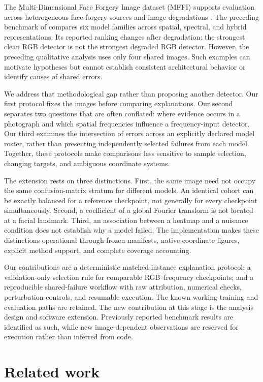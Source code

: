 \documentclass{article}
\begin{document}
The Multi-Dimensional Face Forgery Image dataset (MFFI) supports evaluation across heterogeneous face-forgery sources and image degradations \citep{miao2025}. The preceding benchmark of \citet{cunha2026} compares six model families across spatial, spectral, and hybrid representations. Its reported ranking changes after degradation: the strongest clean RGB detector is not the strongest degraded RGB detector. However, the preceding qualitative analysis uses only four shared images. Such examples can motivate hypotheses but cannot establish consistent architectural behavior or identify causes of shared errors.

We address that methodological gap rather than proposing another detector. Our first protocol fixes the images before comparing explanations. Our second separates two questions that are often conflated: where evidence occurs in a photograph and which spatial frequencies influence a frequency-input detector. Our third examines the intersection of errors across an explicitly declared model roster, rather than presenting independently selected failures from each model. Together, these protocols make comparisons less sensitive to sample selection, changing targets, and ambiguous coordinate systems.

The extension rests on three distinctions. First, the same image need not occupy the same confusion-matrix stratum for different models. An identical cohort can be exactly balanced for a reference checkpoint, not generally for every checkpoint simultaneously. Second, a coefficient of a global Fourier transform is not located at a facial landmark. Third, an association between a heatmap and a nuisance condition does not establish why a model failed. The implementation makes these distinctions operational through frozen manifests, native-coordinate figures, explicit method support, and complete coverage accounting.

Our contributions are a deterministic matched-instance explanation protocol; a validation-only selection rule for comparable RGB--frequency checkpoints; and a reproducible shared-failure workflow with raw attribution, numerical checks, perturbation controls, and resumable execution. The known working training and evaluation paths are retained. The new contribution at this stage is the analysis design and software extension. Previously reported benchmark results are identified as such, while new image-dependent observations are reserved for execution rather than inferred from code.

\section{Related work}
\end{document}
